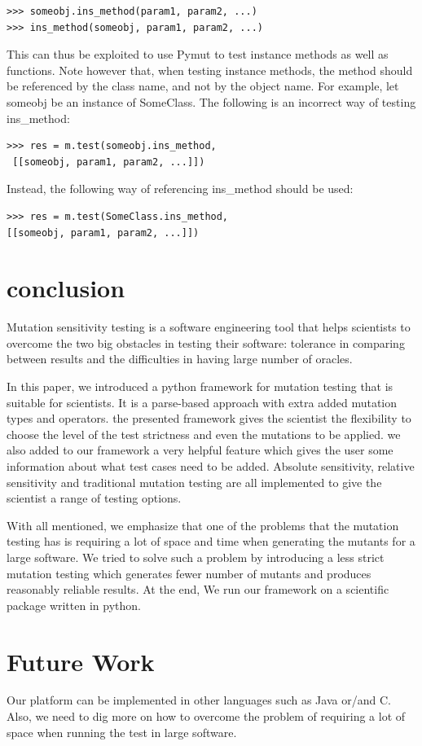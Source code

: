 \documentclass{acm_proc_article-sp}
\begin{document}
\begin{lstlisting}
>>> someobj.ins_method(param1, param2, ...)
>>> ins_method(someobj, param1, param2, ...)
\end{lstlisting}

This can thus be exploited to use Pymut to test instance methods as well as functions. Note however that, when testing instance methods, the method should be referenced by the class name, and not by the object name. For example, let someobj be an instance of SomeClass. The following is an incorrect way of testing ins\_method:

\begin{lstlisting}
>>> res = m.test(someobj.ins_method,
 [[someobj, param1, param2, ...]])
\end{lstlisting}

Instead, the following way of referencing ins\_method should be used:

\begin{lstlisting}
>>> res = m.test(SomeClass.ins_method, 
[[someobj, param1, param2, ...]])
\end{lstlisting}

\section{conclusion}

Mutation sensitivity testing is a software engineering tool that helps scientists to overcome the two big obstacles in testing their software: tolerance in comparing between results and the difficulties in having large number of oracles.

In this paper, we introduced a python framework for mutation testing that is suitable for scientists. It is a parse-based approach with extra added mutation types and operators. the presented framework gives the scientist the flexibility to choose the level of the test strictness and even the mutations to be applied. we also added to our framework a very helpful feature which gives the user some information about what test cases need to be added. Absolute sensitivity, relative sensitivity and traditional mutation testing are all implemented to give the scientist a range of testing options. 

With all mentioned, we emphasize that one of the problems that the mutation testing has is requiring a lot of space and time when generating the mutants for a large software. We tried to solve such a problem by introducing a less strict mutation testing which generates fewer number of mutants and produces reasonably reliable results. At the end, We run our framework on a scientific package written in python.

\section{Future Work}
Our platform can be implemented in other languages such as Java or/and C. Also, we need to dig more on how to overcome the problem of requiring a lot of space when running the test in large software.


  
\end{document}
